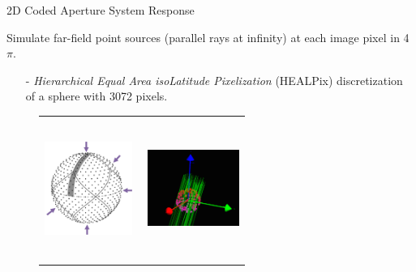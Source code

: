 \documentclass[xcolor=x11names,compress]{beamer}
\renewcommand{\(}{\begin{columns}}
\renewcommand{\)}{\end{columns}}
\newcommand{\<}[1]{\begin{column}{#1}}
\renewcommand{\>}{\end{column}}
\begin{document}
\begin{frame}{2D Coded Aperture System Response}

Simulate far-field point sources (parallel rays at infinity) at each image pixel in 4$\pi$.
\begin{itemize}
\small
\item[-] \emph{Hierarchical Equal Area isoLatitude Pixelization} (HEALPix) \cite{Gorski} discretization of a sphere with 3072 pixels.
\end{itemize}

\begin{figure}
\centering
\begin{tabular}{m{0.3\linewidth} m{0.3\linewidth}}
\includegraphics[height=1.2in]{Figures/Healpix.png} &
\includegraphics[height=1.8in]{Figures/FarFieldVis2.png}
\end{tabular}
\end{figure}

\end{frame}
\end{document}
